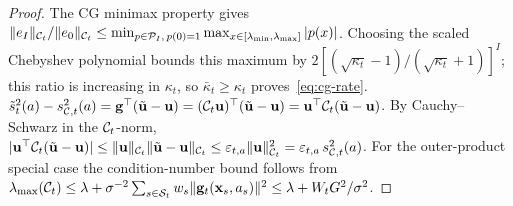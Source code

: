 \begin{proof}
The CG minimax property gives
$\|e_I\|_{\mathcal{C}_t}/\|e_0\|_{\mathcal{C}_t}
\le\min_{p\in\mathcal P_I,\,p(0)=1}
\max_{x\in[\lambda_{\min},\lambda_{\max}]}|p(x)|$.
Choosing the scaled Chebyshev polynomial bounds this maximum by
$2[(\sqrt{\kappa_t}-1)/(\sqrt{\kappa_t}+1)]^I$; this ratio is increasing in
$\kappa_t$, so $\bar\kappa_t\ge\kappa_t$ proves~\eqref{eq:cg-rate}.
$\tilde{s}_t^2(a) - s_{\mathcal{C},t}^2(a)
= \mathbf{g}^\top(\tilde{\mathbf{u}}-\mathbf{u})
= (\mathcal{C}_t\mathbf{u})^\top(\tilde{\mathbf{u}}-\mathbf{u})
= \mathbf{u}^\top\mathcal{C}_t(\tilde{\mathbf{u}}-\mathbf{u})$.
By Cauchy--Schwarz in the $\mathcal{C}_t$-norm,
$|\mathbf{u}^\top\mathcal{C}_t(\tilde{\mathbf{u}}-\mathbf{u})|
\le\|\mathbf{u}\|_{\mathcal{C}_t}\|\tilde{\mathbf{u}}-\mathbf{u}\|_{\mathcal{C}_t}
\le\varepsilon_{t,a}\|\mathbf{u}\|_{\mathcal{C}_t}^2 = \varepsilon_{t,a}\,s_{\mathcal{C},t}^2(a)$.
For the outer-product special case the condition-number bound follows from
$\lambda_{\max}(\mathcal{C}_t)\le\lambda+\sigma^{-2}\sum_{s\in\mathcal{S}_t} w_s\|\mathbf{g}_t(\mathbf{x}_s,a_s)\|^2
\le\lambda+W_tG^2/\sigma^2$.
\end{proof}

